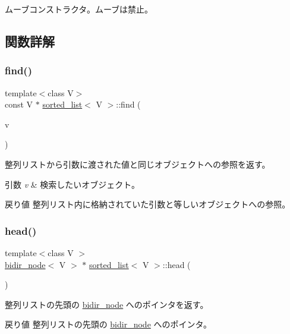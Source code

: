 ムーブコンストラクタ。ムーブは禁止。 

\subsection{関数詳解}
\hypertarget{classsorted__list_a013a3060fad4b6f11507ad2d66fea59b}{}\label{classsorted__list_a013a3060fad4b6f11507ad2d66fea59b} 
\subsubsection{\texorpdfstring{find()}{find()}}
{\footnotesize\ttfamily template$<$class V$>$ \\
const V $\ast$ \hyperlink{classsorted__list}{sorted\+\_\+list}$<$ V $>$\+::find (\begin{DoxyParamCaption}\item[{const V \&}]{v }\end{DoxyParamCaption})}

整列リストから引数に渡された値と同じオブジェクトへの参照を返す。 
\begin{DoxyParams}{引数}
{\em v} & 検索したいオブジェクト。 \\
\hline
\end{DoxyParams}
\begin{DoxyReturn}{戻り値}
整列リスト内に格納されていた引数と等しいオブジェクトへの参照。 
\end{DoxyReturn}
\hypertarget{classsorted__list_a31980ee808541eebcf39ac0a1e0a5773}{}\label{classsorted__list_a31980ee808541eebcf39ac0a1e0a5773} 
\subsubsection{\texorpdfstring{head()}{head()}}
{\footnotesize\ttfamily template$<$class V $>$ \\
\hyperlink{classbidir__node}{bidir\+\_\+node}$<$ V $>$ $\ast$ \hyperlink{classsorted__list}{sorted\+\_\+list}$<$ V $>$\+::head (\begin{DoxyParamCaption}{ }\end{DoxyParamCaption})}

整列リストの先頭の \hyperlink{classbidir__node}{bidir\+\_\+node} へのポインタを返す。 \begin{DoxyReturn}{戻り値}
整列リストの先頭の \hyperlink{classbidir__node}{bidir\+\_\+node} へのポインタ。 
\end{DoxyReturn}
\hypertarget{classsorted__list_a7a88d284cebe5f221de7bc45165e02e0}{}\label{classsorted__list_a7a88d284cebe5f221de7bc45165e02e0} 
